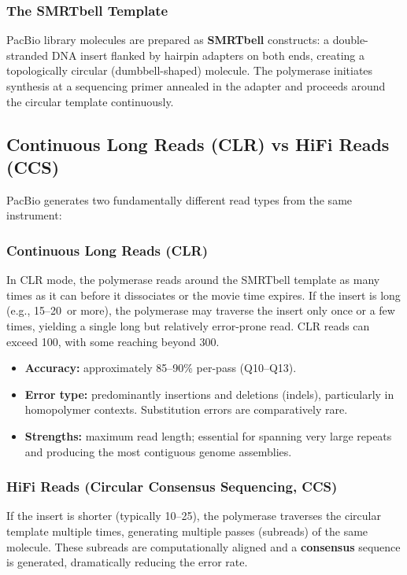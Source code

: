 \subsubsection{The SMRTbell Template}

PacBio library molecules are prepared as \textbf{SMRTbell} constructs: a double-stranded DNA insert flanked by hairpin adapters on both ends, creating a topologically circular (dumbbell-shaped) molecule. The polymerase initiates synthesis at a sequencing primer annealed in the adapter and proceeds around the circular template continuously.

\subsection{Continuous Long Reads (CLR) vs HiFi Reads (CCS)}

PacBio generates two fundamentally different read types from the same instrument:

\subsubsection{Continuous Long Reads (CLR)}

In CLR mode, the polymerase reads around the SMRTbell template as many times as it can before it dissociates or the movie time expires. If the insert is long (e.g., 15--20\kilobase\ or more), the polymerase may traverse the insert only once or a few times, yielding a single long but relatively error-prone read. CLR reads can exceed 100\kilobase, with some reaching beyond 300\kilobase.

\begin{itemize}[nosep]
  \item \textbf{Accuracy:} approximately 85--90\% per-pass (Q10--Q13).
  \item \textbf{Error type:} predominantly insertions and deletions (indels), particularly in homopolymer contexts. Substitution errors are comparatively rare.
  \item \textbf{Strengths:} maximum read length; essential for spanning very large repeats and producing the most contiguous genome assemblies.
\end{itemize}

\subsubsection{HiFi Reads (Circular Consensus Sequencing, CCS)}

If the insert is shorter (typically 10--25\kilobase), the polymerase traverses the circular template multiple times, generating multiple passes (subreads) of the same molecule. These subreads are computationally aligned and a \textbf{consensus} sequence is generated, dramatically reducing the error rate.

